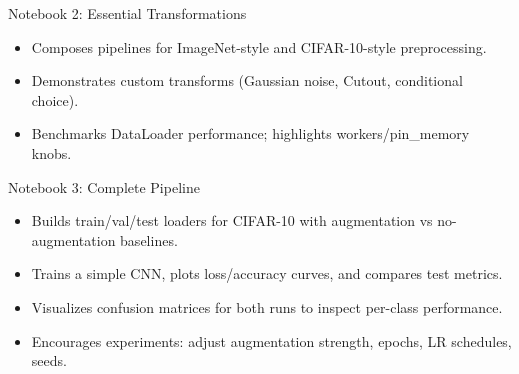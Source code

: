 \documentclass{beamer}
\begin{document}
\begin{frame}{Notebook 2: Essential Transformations}
  \begin{itemize}
    \item Composes pipelines for ImageNet-style and CIFAR-10-style preprocessing.
    \item Demonstrates custom transforms (Gaussian noise, Cutout, conditional choice).
    \item Benchmarks DataLoader performance; highlights workers/pin\_memory knobs.
  \end{itemize}
\end{frame}

\begin{frame}{Notebook 3: Complete Pipeline}
  \begin{itemize}
    \item Builds train/val/test loaders for CIFAR-10 with augmentation vs no-augmentation baselines.
    \item Trains a simple CNN, plots loss/accuracy curves, and compares test metrics.
    \item Visualizes confusion matrices for both runs to inspect per-class performance.
    \item Encourages experiments: adjust augmentation strength, epochs, LR schedules, seeds.
  \end{itemize}
\end{frame}
\end{document}
